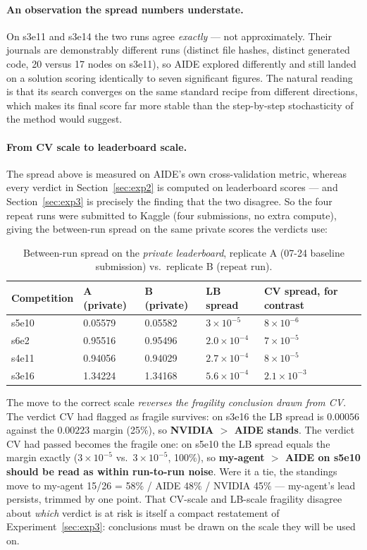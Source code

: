 \documentclass[11pt,a4paper]{article}
\begin{document}
\paragraph{An observation the spread numbers understate.} On s3e11 and s3e14 the two runs agree \emph{exactly} --- not approximately. Their journals are demonstrably different runs (distinct file hashes, distinct generated code, 20 versus 17 nodes on s3e11), so AIDE explored differently and still landed on a solution scoring identically to seven significant figures. The natural reading is that its search converges on the same standard recipe from different directions, which makes its final score far more stable than the step-by-step stochasticity of the method would suggest.

\paragraph{From CV scale to leaderboard scale.} The spread above is measured on AIDE's own cross-validation metric, whereas every verdict in Section~\ref{sec:exp2} is computed on leaderboard scores --- and Section~\ref{sec:exp3} is precisely the finding that the two disagree. So the four repeat runs were submitted to Kaggle (four submissions, no extra compute), giving the between-run spread on the same private scores the verdicts use:

\begin{table}[H]
\centering\small
\caption{Between-run spread on the \emph{private leaderboard}, replicate A (07-24 baseline submission) vs.\ replicate B (repeat run).}
\begin{tabular}{@{}lllll@{}}
\toprule
\textbf{Competition} & \textbf{A (private)} & \textbf{B (private)} & \textbf{LB spread} & \textbf{CV spread, for contrast} \\
\midrule
s5e10 & 0.05579 & 0.05582 & $3\times10^{-5}$ & $8\times10^{-6}$ \\
s6e2 & 0.95516 & 0.95496 & $2.0\times10^{-4}$ & $7\times10^{-5}$ \\
s4e11 & 0.94056 & 0.94029 & $2.7\times10^{-4}$ & $8\times10^{-5}$ \\
s3e16 & 1.34224 & 1.34168 & $5.6\times10^{-4}$ & $2.1\times10^{-3}$ \\
\bottomrule
\end{tabular}
\end{table}

The move to the correct scale \emph{reverses the fragility conclusion drawn from CV}. The verdict CV had flagged as fragile survives: on s3e16 the LB spread is $0.00056$ against the $0.00223$ margin (25\%), so \textbf{NVIDIA $>$ AIDE stands}. The verdict CV had passed becomes the fragile one: on s5e10 the LB spread equals the margin exactly ($3\times10^{-5}$ vs.\ $3\times10^{-5}$, 100\%), so \textbf{my-agent $>$ AIDE on s5e10 should be read as within run-to-run noise}. Were it a tie, the standings move to my-agent 15/26 = 58\% / AIDE 48\% / NVIDIA 45\% --- my-agent's lead persists, trimmed by one point. That CV-scale and LB-scale fragility disagree about \emph{which} verdict is at risk is itself a compact restatement of Experiment~\ref{sec:exp3}: conclusions must be drawn on the scale they will be used on.
\end{document}
